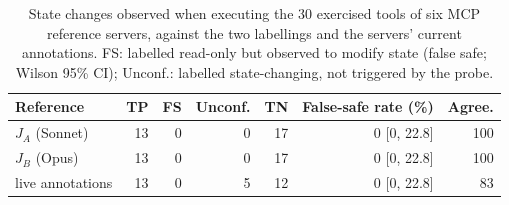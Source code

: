 \begin{table}[t]
\centering
\caption{State changes observed when executing the 30 exercised tools of six MCP
reference servers, against the two labellings and the servers' current annotations. FS: labelled read-only but
observed to modify state (false safe; Wilson 95\% CI); Unconf.: labelled state-changing, not triggered by the
probe.}
\label{tab:ev-observed}
\scriptsize
\setlength{\tabcolsep}{3pt}
\begin{tabular}{@{}lrrrrrr@{}}
\toprule
Reference & TP & FS & Unconf. & TN & False-safe rate (\%) & Agree. \\
\midrule
$J_A$ (Sonnet) & 13 & 0 & 0 & 17 & 0 [0, 22.8] & 100 \\
$J_B$ (Opus) & 13 & 0 & 0 & 17 & 0 [0, 22.8] & 100 \\
live annotations & 13 & 0 & 5 & 12 & 0 [0, 22.8] & 83 \\
\bottomrule
\end{tabular}
\end{table}
